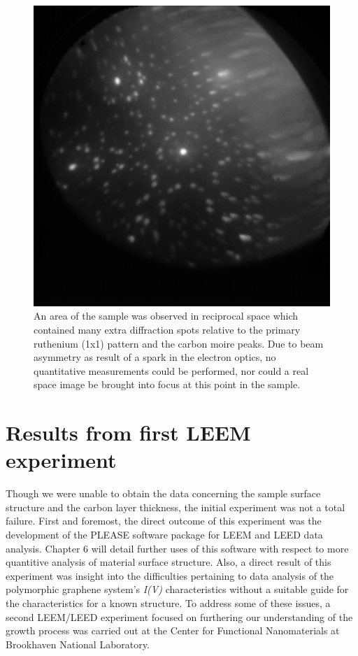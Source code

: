 \begin{figure}
  \centering
  \includegraphics[scale=0.5]{./figs/extraLEED}
  \caption{An area of the sample was observed in reciprocal space which contained many extra diffraction spots relative to the primary ruthenium (1x1) pattern and the carbon moire peaks. Due to beam asymmetry as result of a spark in the electron optics, no quantitative measurements could be performed, nor could a real space image be brought into focus at this point in the sample.}
  \label{fig:ExtraLEEDSpots}
\end{figure}

\section{Results from first LEEM experiment}

Though we were unable to obtain the data concerning the sample surface structure and the carbon layer thickness, the initial experiment was not a total failure. First and foremost, the direct outcome of this experiment was the development of the PLEASE software package for LEEM and LEED data analysis. Chapter 6 will detail further uses of this software with respect to more quantitive analysis of material surface structure. Also, a direct result of this experiment was insight into the difficulties pertaining to data analysis of the polymorphic graphene system's \textit{I(V)} characteristics without a suitable guide for the characteristics for a known structure. To address some of these issues, a second LEEM/LEED experiment focused on furthering our understanding of the growth process was carried out at the Center for Functional Nanomaterials at Brookhaven National Laboratory.


